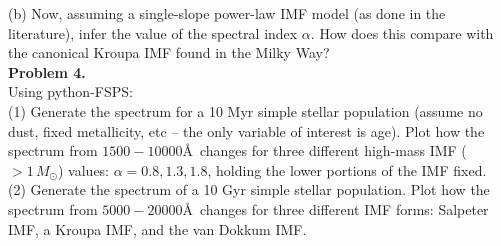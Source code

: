 \documentclass{article}
\begin{document}
(b) Now, assuming a single-slope power-law IMF model (as done in the literature), infer the value of the spectral index $\alpha$.  How does this compare with the canonical Kroupa IMF found in the Milky Way?  \\


\noindent \textbf{Problem 4.} \\ 

Using python-FSPS: \\

(1) Generate the spectrum for a 10 Myr simple stellar population (assume no dust, fixed metallicity, etc -- the only variable of interest is age). Plot how the spectrum from $1500- 10000$\AA\ changes for three different high-mass IMF ($>1\, M_{\odot}$) values: $\alpha=0.8, 1.3, 1.8$, holding the lower portions of the IMF fixed.  \\

(2) Generate the spectrum of a 10 Gyr simple stellar population.  Plot how the spectrum from $5000-20000$\AA\ changes for three different IMF forms: Salpeter IMF, a Kroupa IMF, and the van Dokkum IMF. 
\end{document}
